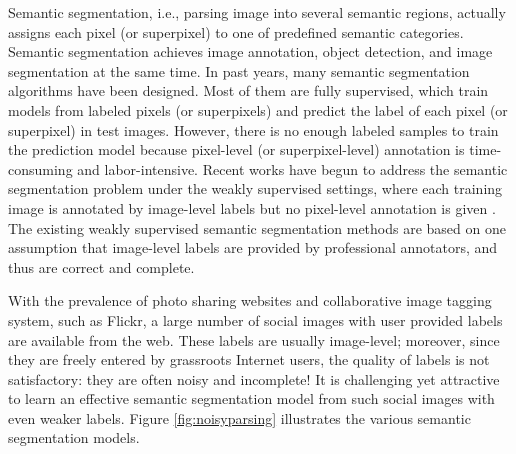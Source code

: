 Semantic segmentation, i.e., parsing image into several semantic regions, actually assigns each pixel (or  superpixel) to one of predefined semantic categories. Semantic segmentation achieves image annotation, object detection, and image segmentation at the same time.  In past years, many semantic segmentation algorithms have been designed. Most of  them are fully supervised, which train models from labeled pixels (or  superpixels) and predict  the label of each pixel (or  superpixel) in test images. However, there is no enough labeled samples to train the prediction model because pixel-level (or  superpixel-level) annotation is time-consuming and labor-intensive.
Recent works have begun to address the semantic segmentation problem under the weakly supervised settings, where each training image is annotated by image-level labels  but no pixel-level annotation is given \cite{verbeek2007region,vezhnevets2010towards,vezhnevets2011weakly,vezhnevets2012weakly,xu2014tell,zhang2013sparse,zhang2013probabilistic}. The existing weakly supervised semantic  segmentation methods are based on one assumption that image-level labels are provided by professional annotators, and thus are correct and complete.

With the prevalence of photo sharing websites and collaborative image tagging system, such as Flickr, a large number of social images with user provided labels are available from the web. These labels are usually image-level; moreover, since they are freely entered by grassroots Internet users, the quality of labels is not satisfactory: they are often noisy and incomplete!  It is challenging yet attractive to learn an effective semantic segmentation model from such social images with even weaker labels.  Figure \ref{fig:noisyparsing} illustrates the various  semantic segmentation models.






%

